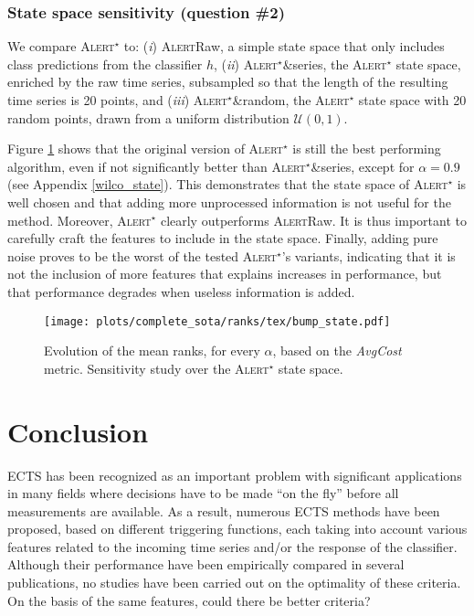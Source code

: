 \documentclass[sigconf, nonacm, table]{acmart}
\begin{document}
\subsubsection{State space sensitivity {\bf (question \#2)}}

We compare \textsc{Alert$^{\star}$} to: (\textit{i}) \textsc{Alert}Raw, a simple state space that only includes class predictions from the classifier $h$,  (\textit{ii}) \textsc{Alert}$^\star$\&series, the \textsc{Alert$^{\star}$} state space, enriched by the raw time series, subsampled so that the length of the resulting time series is 20 points, and (\textit{iii}) \textsc{Alert}$^\star$\&ran\-dom, the \textsc{Alert$^{\star}$} state space with 20 random points, drawn from a uniform distribution $\mathcal{U}(0, 1)$. 

Figure \ref{fig:bump_ablation} shows that the original version of \textsc{Alert$^{\star}$} is still the best performing algorithm, even if not significantly better than \textsc{Alert}$^\star$\&series, except for $\alpha = 0.9$ (see Appendix \ref{wilco_state}). This demonstrates that the state space of \textsc{Alert$^{\star}$} is well chosen and that adding more unprocessed information is not useful for the method. Moreover, \textsc{Alert$^{\star}$} clearly outperforms \textsc{Alert}Raw. It is thus important to carefully craft the features to include in the state space. Finally, adding pure noise proves to be the worst of the tested \textsc{Alert$^{\star}$}'s variants, indicating that it is not the inclusion of more features that explains increases in performance, but that performance degrades when useless information is added.

\begin{figure}[!htb]
    \centering
    \texttt{[image: plots/complete\_sota/ranks/tex/bump\_state.pdf]}
    \caption{Evolution of the mean ranks, for every $\alpha$, based on the \textit{AvgCost} metric. Sensitivity study over the \textsc{Alert$^{\star}$} state space.}
    \label{fig:bump_ablation}
\end{figure}

\section{Conclusion}
\label{sec:conclusion}

 ECTS has been recognized as an important problem with significant applications in many fields where decisions have to be made ``on the fly'' before all measurements are available. As a result, numerous ECTS methods have been proposed, based on different triggering functions, each taking into account various features related to the incoming time series and/or the response of the classifier. Although their performance have been empirically compared in several publications, no studies have been carried out on the optimality of these criteria. On the basis of the same features, could there be better criteria? 
\end{document}
